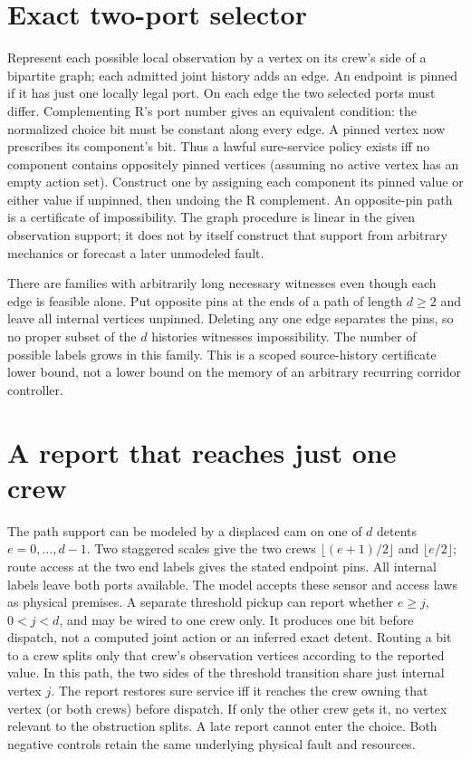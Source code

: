 \documentclass[11pt]{article}
\begin{document}
\section{Exact two-port selector}
Represent each possible local observation by a vertex on its crew's
side of a bipartite graph; each admitted joint history adds an edge.
An endpoint is pinned if it has just one locally legal port. On each
edge the two selected ports must differ. Complementing R's port
number gives an equivalent condition: the normalized choice bit must
be constant along every edge. A pinned vertex now prescribes its
component's bit. Thus a lawful sure-service policy exists iff no
component contains oppositely pinned vertices (assuming no active
vertex has an empty action set). Construct one by assigning each
component its pinned value or either value if unpinned, then undoing
the R complement. An opposite-pin path is a certificate of
impossibility. The graph procedure is linear in the given observation
support; it does not by itself construct that support from arbitrary
mechanics or forecast a later unmodeled fault.

There are families with arbitrarily long necessary witnesses even
though each edge is feasible alone. Put opposite pins at the ends of
a path of length \(d\geq2\) and leave all internal vertices unpinned.
Deleting any one edge separates the pins, so no proper subset of
the \(d\) histories witnesses impossibility. The number of possible
labels grows in this family. This is a scoped source-history
certificate lower bound, not a lower bound on the memory of an
arbitrary recurring corridor controller.

\section{A report that reaches just one crew}
The path support can be modeled by a displaced cam on one of \(d\)
detents \(e=0,\ldots,d-1\). Two staggered scales give the two crews
\(\lfloor(e+1)/2\rfloor\) and \(\lfloor e/2\rfloor\); route access at
the two end labels gives the stated endpoint pins. All internal
labels leave both ports available. The model accepts these sensor
and access laws as physical premises. A separate threshold pickup
can report whether \(e\geq j\), \(0<j<d\), and may be wired to one
crew only. It produces one bit before dispatch, not a computed joint
action or an inferred exact detent. Routing a bit to a crew splits
only that crew's observation vertices according to the reported value.
In this path, the two sides of the threshold transition share just
internal vertex \(j\). The report restores sure service iff it
reaches the crew owning that vertex (or both crews) before dispatch.
If only the other crew gets it, no vertex relevant to the obstruction
splits. A late report cannot enter the choice. Both negative controls
retain the same underlying physical fault and resources.
\end{document}
